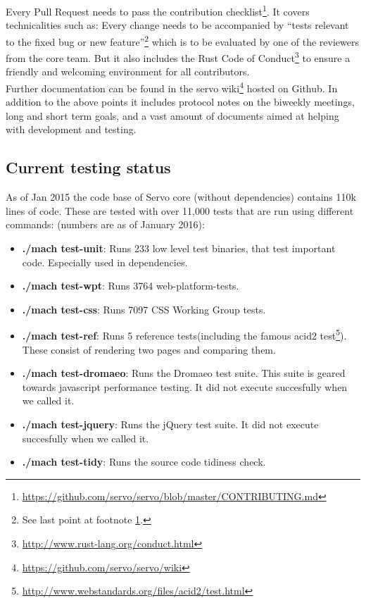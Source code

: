 \documentclass{scrartcl}
\begin{document}
Every Pull Request needs to pass the contribution checklist\footnote{\label{contributing}\url{https://github.com/servo/servo/blob/master/CONTRIBUTING.md}}. It covers technicalities such as: Every change needs to be accompanied by ``tests relevant to the fixed bug or new feature''\footnote{See last point at footnote \ref{contributing}.} which is to be evaluated by one of the reviewers from the core team. But it also includes the Rust Code of Conduct\footnote{\url{http://www.rust-lang.org/conduct.html}} to ensure a friendly and welcoming environment for all contributors.  \\

Further documentation can be found in the servo wiki\footnote{\url{https://github.com/servo/servo/wiki}} hosted on Github. In addition to the above points it includes protocol notes on the biweekly meetings, long and short term goals, and a vast amount of documents aimed at helping with development and testing.

\subsection{Current testing status} \label{test_status}

As of Jan 2015 the code base of Servo core (without dependencies) contains 110k lines of code. These are tested with over 11,000 tests that are run using different commands: (numbers are as of January 2016):
\begin{itemize}
    \item \textbf{./mach test-unit}: Runs 233 low level test binaries, that test important code. Especially used in dependencies.
    \item \textbf{./mach test-wpt}: Runs 3764 web-platform-tests. 
    \item \textbf{./mach test-css}: Runs 7097 CSS Working Group tests.
    \item \textbf{./mach test-ref}: Runs 5 reference tests(including the famous acid2 test\footnote{\url{http://www.webstandards.org/files/acid2/test.html}}). These consist of rendering two pages and comparing them.
    \item \textbf{./mach test-dromaeo}: Runs the Dromaeo test suite. This suite is geared towards javascript performance testing. It did not execute succesfully when we called it.
    \item \textbf{./mach test-jquery}: Runs the jQuery test suite. It did not execute succesfully when we called it.
    \item \textbf{./mach test-tidy}: Runs the source code tidiness check.
\end{itemize}
\end{document}

